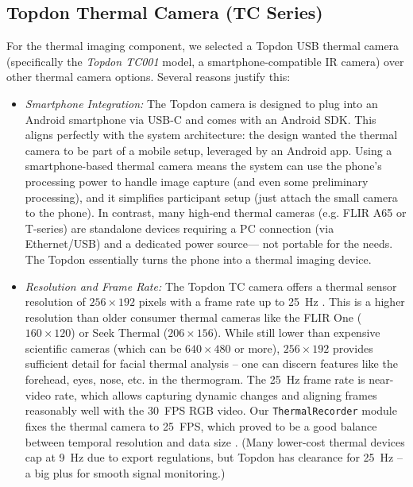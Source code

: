 \documentclass{report}
\begin{document}
\subsection*{Topdon Thermal Camera (TC Series)}
For the thermal imaging component, we selected a Topdon USB thermal camera (specifically the \textit{Topdon TC001} model, a smartphone-compatible IR camera) over other thermal camera options. Several reasons justify this:
\begin{itemize}
	\item \textit{Smartphone Integration:} The Topdon camera is designed to plug into an Android smartphone via USB-C and comes with an Android SDK. This aligns perfectly with the system architecture: the design wanted the thermal camera to be part of a mobile setup, leveraged by an Android app. Using a smartphone-based thermal camera means the system can use the phone's processing power to handle image capture (and even some preliminary processing), and it simplifies participant setup (just attach the small camera to the phone). In contrast, many high-end thermal cameras (e.g. FLIR A65 or T-series) are standalone devices requiring a PC connection (via Ethernet/USB) and a dedicated power source--- not portable for the needs. The Topdon essentially turns the phone into a thermal imaging device.

	\item \textit{Resolution and Frame Rate:} The Topdon TC camera offers a thermal sensor resolution of $256 \times 192$ pixels with a frame rate up to 25~Hz \cite{topdon20}. This is a higher resolution than older consumer thermal cameras like the FLIR One ($160 \times 120$) or Seek Thermal ($206 \times 156$). While still lower than expensive scientific cameras (which can be $640 \times 480$ or more), $256 \times 192$ provides sufficient detail for facial thermal analysis -- one can discern features like the forehead, eyes, nose, etc. in the thermogram. The 25~Hz frame rate is near-video rate, which allows capturing dynamic changes and aligning frames reasonably well with the 30~FPS RGB video. Our \texttt{ThermalRecorder} module fixes the thermal camera to 25~FPS, which proved to be a good balance between temporal resolution and data size \cite{topdon20}. (Many lower-cost thermal devices cap at 9~Hz due to export regulations, but Topdon has clearance for 25~Hz -- a big plus for smooth signal monitoring.)


\end{itemize}
\end{document}
